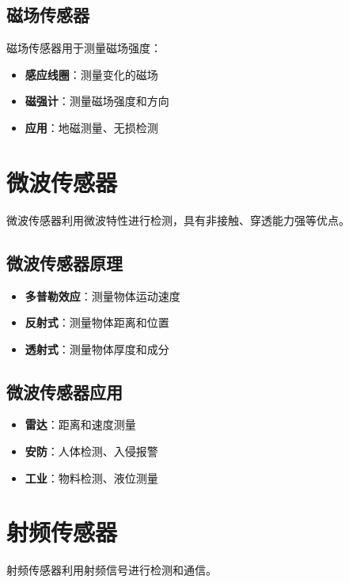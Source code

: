 \documentclass[12pt,UTF8]{ctexbook}
\begin{document}
\subsection{磁场传感器}

磁场传感器用于测量磁场强度：

\begin{itemize}[leftmargin=2cm]
	\item \textbf{感应线圈}：测量变化的磁场
	\item \textbf{磁强计}：测量磁场强度和方向
	\item \textbf{应用}：地磁测量、无损检测
\end{itemize}

\section{微波传感器}

微波传感器利用微波特性进行检测，具有非接触、穿透能力强等优点。

\subsection{微波传感器原理}

\begin{itemize}[leftmargin=2cm]
	\item \textbf{多普勒效应}：测量物体运动速度
	\item \textbf{反射式}：测量物体距离和位置
	\item \textbf{透射式}：测量物体厚度和成分
\end{itemize}

\subsection{微波传感器应用}

\begin{itemize}[leftmargin=2cm]
	\item \textbf{雷达}：距离和速度测量
	\item \textbf{安防}：人体检测、入侵报警
	\item \textbf{工业}：物料检测、液位测量
\end{itemize}

\section{射频传感器}

射频传感器利用射频信号进行检测和通信。
\end{document}
